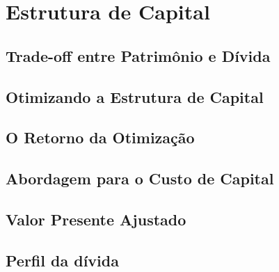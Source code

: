 \chapter{Estrutura de Capital}
\section{Trade-off entre Patrimônio e Dívida}

\section{Otimizando a Estrutura de Capital}

\section{O Retorno da Otimização}

\section{Abordagem para o Custo de Capital}

\section{Valor Presente Ajustado}

\section{Perfil da dívida}

